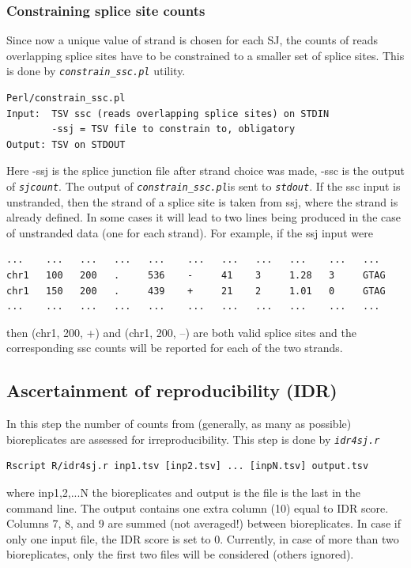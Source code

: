 \documentclass{article}
\newcommand{\prog}[1]{{\tt\em #1}}
\begin{document}
\subsubsection{Constraining splice site counts}
Since now a unique value of strand is chosen for each SJ, the counts of reads overlapping splice sites have to be constrained to a smaller set of splice sites.
This is done by \prog{constrain\_ssc.pl} utility.
\begin{verbatim}
Perl/constrain_ssc.pl
Input:  TSV ssc (reads overlapping splice sites) on STDIN
        -ssj = TSV file to constrain to, obligatory
Output: TSV on STDOUT
\end{verbatim}
Here -ssj is the splice junction file after strand choice was made, -ssc is the output of \prog{sjcount}. The output of \prog{constrain\_ssc.pl}is sent to \prog{stdout}. 
If the ssc input is unstranded, then the strand of a splice site is taken from ssj, where the strand is already defined. In some cases it will lead to two 
lines being produced in the case of unstranded data (one for each strand). For example, if the ssj input were
\begin{verbatim}
...    ...   ...   ...   ...    ...   ...   ...   ...    ...   ...
chr1   100   200   .     536    -     41    3     1.28   3     GTAG
chr1   150   200   .     439    +     21    2     1.01   0     GTAG
...    ...   ...   ...   ...    ...   ...   ...   ...    ...   ...
\end{verbatim}
then (chr1, 200, +) and (chr1, 200, --) are both valid splice sites and the corresponding ssc counts will be reported for each of the two strands.

\subsection{Ascertainment of reproducibility (IDR)}
In this step the number of counts from (generally, as many as possible) bioreplicates are assessed for irreproducibility. This step is done by \prog{idr4sj.r}
\begin{verbatim}
Rscript R/idr4sj.r inp1.tsv [inp2.tsv] ... [inpN.tsv] output.tsv
\end{verbatim}
where inp1,2,...N the bioreplicates and output is the file is the last in the command line. The output contains one extra column (10) equal to IDR score.
Columns 7, 8, and 9 are summed (not averaged!) between bioreplicates. 
In case if only one input file, the IDR score is set to 0. Currently, in case of more than two bioreplicates, only the first two files will be considered (others ignored).
\end{document}
